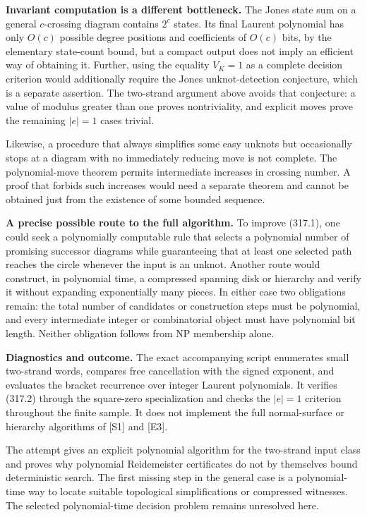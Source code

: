 \documentclass[11pt]{article}
\begin{document}
\textbf{Invariant computation is a different bottleneck.} The Jones state sum on a general $c$-crossing diagram contains $2^c$ states. Its final Laurent polynomial has only $O(c)$ possible degree positions and coefficients of $O(c)$ bits, by the elementary state-count bound, but a compact output does not imply an efficient way of obtaining it. Further, using the equality $V_K=1$ as a complete decision criterion would additionally require the Jones unknot-detection conjecture, which is a separate assertion. The two-strand argument above avoids that conjecture: a value of modulus greater than one proves nontriviality, and explicit moves prove the remaining $|e|=1$ cases trivial.

Likewise, a procedure that always simplifies some easy unknots but occasionally stops at a diagram with no immediately reducing move is not complete. The polynomial-move theorem permits intermediate increases in crossing number. A proof that forbids such increases would need a separate theorem and cannot be obtained just from the existence of some bounded sequence.

\textbf{A precise possible route to the full algorithm.} To improve (317.1), one could seek a polynomially computable rule that selects a polynomial number of promising successor diagrams while guaranteeing that at least one selected path reaches the circle whenever the input is an unknot. Another route would construct, in polynomial time, a compressed spanning disk or hierarchy and verify it without expanding exponentially many pieces. In either case two obligations remain: the total number of candidates or construction steps must be polynomial, and every intermediate integer or combinatorial object must have polynomial bit length. Neither obligation follows from NP membership alone.

\textbf{Diagnostics and outcome.} The exact accompanying script enumerates small two-strand words, compares free cancellation with the signed exponent, and evaluates the bracket recurrence over integer Laurent polynomials. It verifies (317.2) through the square-zero specialization and checks the $|e|=1$ criterion throughout the finite sample. It does not implement the full normal-surface or hierarchy algorithms of [S1] and [E3].

The attempt gives an explicit polynomial algorithm for the two-strand input class and proves why polynomial Reidemeister certificates do not by themselves bound deterministic search. The first missing step in the general case is a polynomial-time way to locate suitable topological simplifications or compressed witnesses. The selected polynomial-time decision problem remains unresolved here.
\end{document}
